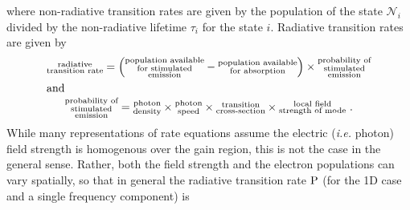 \documentclass[12pt]{report}
\begin{document}
where non-radiative transition rates are given by the population of the state $\mathcal{N}_i$ divided by the non-radiative lifetime $\tau_i$ for the state $i$.  Radiative transition rates are given by
\begin{gather*}
\begin{subarray}{c}\textnormal{radiative}\\\textnormal{transition rate}\end{subarray} =
\left( \begin{subarray}{c}\textnormal{population available}\\\textnormal{for stimulated}\\\textnormal{emission}\end{subarray} - \begin{subarray}{c}\textnormal{population available}\\\textnormal{for absorption}\end{subarray}\right) \times \begin{subarray}{c}\textnormal{probability of}\\\textnormal{stimulated}\\\textnormal{emission}\end{subarray}\\
\intertext{and}
\begin{subarray}{c}\textnormal{probability of}\\\textnormal{stimulated}\\\textnormal{emission}\end{subarray} = \begin{subarray}{c}\textnormal{photon}\\\textnormal{density}\end{subarray} \times \begin{subarray}{c}\textnormal{photon}\\\textnormal{speed}\end{subarray} \times \begin{subarray}{c}\textnormal{transition}\\\textnormal{cross-section}\end{subarray} \times
\begin{subarray}{c}\textnormal{local field}\\\textnormal{strength of mode}\end{subarray} \textnormal{~.}
\end{gather*}
While many representations of rate equations assume the electric (\emph{i.e.} photon) field strength is homogenous over the gain region, this is not the case in the general sense.  Rather, both the field strength and the electron populations can vary spatially, so that in general the radiative transition rate $\textnormal{P}$ (for the 1D case and a single frequency component) is
\end{document}
